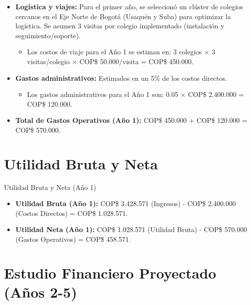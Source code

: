 \begin{frame}
    \begin{itemize}
        \item \textbf{Logística y viajes:} Para el primer año, se seleccionó un 
					clúster de colegios cercanos en el Eje Norte de Bogotá 
					(Usaquén y Suba) para optimizar la logística. Se asumen 3 visitas por 
					colegio implementado (instalación y seguimiento/soporte).
        \begin{itemize}
            \item Los costos de viaje para el Año 1 se estiman en: 
							3 colegios $\times$ 3 visitas/colegio $\times$ 
							COP\$ 50.000/visita = COP\$ 450.000.
        \end{itemize}
        \item \textbf{Gastos administrativos:} Estimados en un 5\% de los 
					costos directos.
        \begin{itemize}
            \item Los gastos administrativos para el Año 1 son: 0.05 $\times$ 
							COP\$ 2.400.000 = COP\$ 120.000. 
        \end{itemize}
        \item \textbf{Total de Gastos Operativos (Año 1):} COP\$ 450.000 + 
					COP\$ 120.000 = COP\$ 570.000.
    \end{itemize}
\end{frame}

\section{Utilidad Bruta y Neta}

\begin{frame}{Utilidad Bruta y Neta (Año 1)}
    \begin{itemize}
        \item \textbf{Utilidad Bruta (Año 1):} COP\$ 3.428.571 (Ingresos) - 
					COP\$ 2.400.000 (Costos Directos) = COP\$ 1.028.571. 
        \item \textbf{Utilidad Neta (Año 1):} COP\$ 1.028.571 (Utilidad Bruta) 
					- COP\$ 570.000 (Gastos Operativos) = COP\$ 458.571. 
    \end{itemize}
\end{frame}

\section{Estudio Financiero Proyectado (Años 2-5)}

